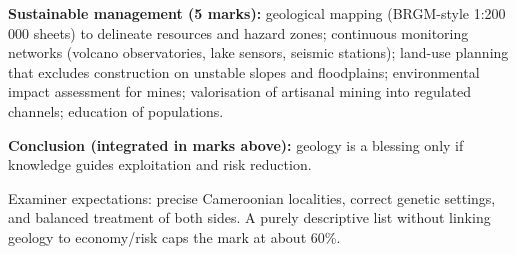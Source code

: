 \documentclass[11pt]{article}
\begin{document}
\begin{corrige}
\textbf{Sustainable management (5 marks):} geological mapping (BRGM-style 1:200 000 sheets) to delineate resources and hazard zones; continuous monitoring networks (volcano observatories, lake sensors, seismic stations); land-use planning that excludes construction on unstable slopes and floodplains; environmental impact assessment for mines; valorisation of artisanal mining into regulated channels; education of populations.

\textbf{Conclusion (integrated in marks above):} geology is a blessing only if knowledge guides exploitation and risk reduction.

\begin{attention}
Examiner expectations: precise Cameroonian localities, correct genetic settings, and balanced treatment of both sides. A purely descriptive list without linking geology to economy/risk caps the mark at about 60\%.
\end{attention}
\end{corrige}
\end{document}
